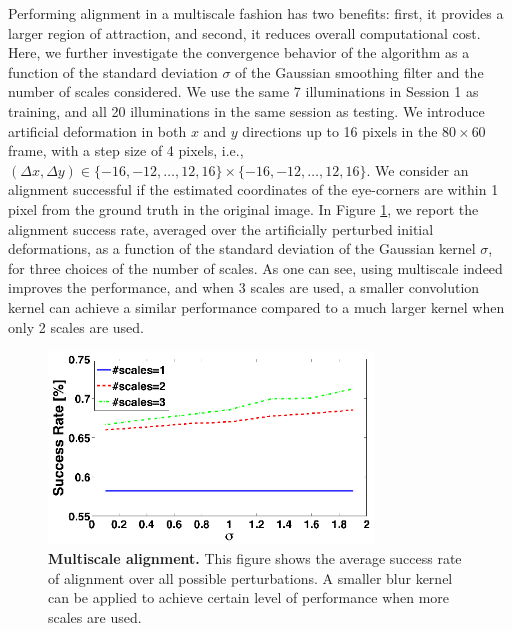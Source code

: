 \documentclass[10pt,journal,letterpaper,compsoc]{IEEEtran}
\begin{document}
Performing alignment in a multiscale fashion has two benefits: first, it provides a larger region of attraction, and second, it reduces overall computational cost. Here, we further investigate the convergence behavior of the algorithm as a function of the standard deviation $\sigma$ of the Gaussian smoothing filter and the number of scales considered.
We use the same 7 illuminations in
Session 1 as training, and all 20 illuminations in the same
session as testing. We introduce artificial deformation in
both $x$ and $y$ directions up to 16 pixels in the
$80\times 60$ frame, with a step size of 4 pixels, i.e.,
$(\Delta x, \Delta y) \in \{-16,-12,\ldots,12,16\} \times
\{-16,-12,\ldots,12,16\}$. We consider an alignment
successful if the estimated coordinates of the eye-corners
are within 1 pixel from the ground truth in the original
image.  In Figure \ref{fig:multiscale}, we report the
alignment success rate, averaged over the artificially
perturbed initial deformations, as a function of the
standard deviation of the Gaussian kernel $\sigma$, for
three choices of the number of scales. As one can see,
using multiscale indeed improves the performance, and when
3 scales are used, a smaller convolution kernel can achieve
a similar performance compared to a much larger kernel when
only 2 scales are used.
\begin{figure}
\centering
\includegraphics[width=3.4in]{Figure_4}
\vspace{-2mm}
\caption{{\bf Multiscale alignment.} This figure shows the average success rate of alignment over all possible perturbations. A smaller blur kernel can be applied to achieve certain level of performance when more scales are used.}
\label{fig:multiscale}
\vspace{-2mm}
\end{figure}
\end{document}
